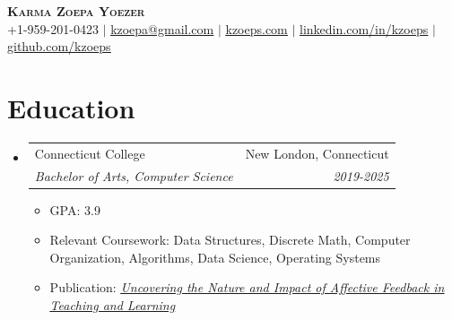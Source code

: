 \documentclass[letterpaper,11pt]{article}
\makeatletter
\newcommand{\resumeItem}[1]{
  \item\small{
    {#1 \vspace{-2pt}}
  }
}
\newcommand{\resumeSubheading}[4]{
  \vspace{-2pt}\item
    \begin{tabular*}{0.97\textwidth}[t]{l@{\extracolsep{\fill}}r}
      {#1} & #2 \\
      \textit{\small#3} & \textit{\small #4} \\
    \end{tabular*}\vspace{-7pt}
}
\newcommand{\resumeSubHeadingListStart}{\begin{itemize}[leftmargin=0.15in, label={}]}
\newcommand{\resumeSubHeadingListEnd}{\end{itemize}}
\newcommand{\resumeItemListStart}{\begin{itemize}}
\newcommand{\resumeItemListEnd}{\end{itemize}\vspace{-5pt}}
\makeatother
\begin{document}


\begin{center}
    \textbf{\Huge \scshape Karma Zoepa Yoezer} \\ \vspace{1pt}
    \small +1-959-201-0423 $|$ \href{mailto:kzoepa@gmail.com}{\underline{kzoepa@gmail.com}} $|$ \href{https://kzoeps.com}{\underline{kzoeps.com}} $|$ 
    \href{https://linkedin.com/in/kzoeps}{\underline{linkedin.com/in/kzoeps}} $|$
    \href{https://github.com/kzoeps}{\underline{github.com/kzoeps}}
\end{center}

%

\section{Education}
  \resumeSubHeadingListStart
    \resumeSubheading
      {Connecticut College}{New London, Connecticut}
      {Bachelor of Arts, Computer Science}{2019-2025}
          \resumeItemListStart
            \resumeItem{GPA: 3.9}
            \resumeItem{Relevant Coursework: Data Structures, Discrete Math, Computer Organization, Algorithms, Data Science, Operating Systems}
            \resumeItem{Publication: \href{https://library.iated.org/view/TARIMO2020UNC}{   \emph{
                \underline{Uncovering the Nature and Impact of Affective Feedback in Teaching and Learning}
                }
            }
        }
            
        \resumeItemListEnd

  \resumeSubHeadingListEnd

\end{document}
